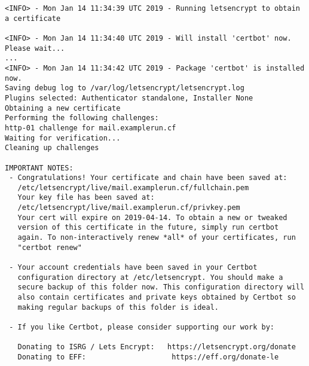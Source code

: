 \begin{lstlisting}[escapeinside=||]
<INFO> - Mon Jan 14 11:34:39 UTC 2019 - Running letsencrypt to obtain a certificate
                                                                                                                                                                                                                                                                                                                                              
<INFO> - Mon Jan 14 11:34:40 UTC 2019 - Will install 'certbot' now. Please wait...
...
<INFO> - Mon Jan 14 11:34:42 UTC 2019 - Package 'certbot' is installed now.
Saving debug log to /var/log/letsencrypt/letsencrypt.log
Plugins selected: Authenticator standalone, Installer None
Obtaining a new certificate
Performing the following challenges:
http-01 challenge for mail.examplerun.cf
Waiting for verification...
Cleaning up challenges
                                                                                                                                                                                                                                                                                                                                              
IMPORTANT NOTES:
 - Congratulations! Your certificate and chain have been saved at:
   /etc/letsencrypt/live/mail.examplerun.cf/fullchain.pem
   Your key file has been saved at:
   /etc/letsencrypt/live/mail.examplerun.cf/privkey.pem
   Your cert will expire on 2019-04-14. To obtain a new or tweaked
   version of this certificate in the future, simply run certbot
   again. To non-interactively renew *all* of your certificates, run
   "certbot renew"

 - Your account credentials have been saved in your Certbot
   configuration directory at /etc/letsencrypt. You should make a
   secure backup of this folder now. This configuration directory will
   also contain certificates and private keys obtained by Certbot so
   making regular backups of this folder is ideal.

 - If you like Certbot, please consider supporting our work by:
                                                                                                                                                                                                                                                                                                                                              
   Donating to ISRG / Lets Encrypt:   https://letsencrypt.org/donate                                                                                                                                                                                                                                                                         
   Donating to EFF:                    https://eff.org/donate-le 


\end{lstlisting}
